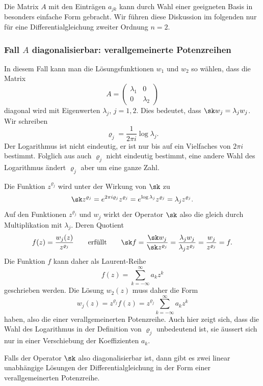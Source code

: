 Die Matrix $A$ mit den Einträgen $a_{jk}$ kann durch Wahl einer
geeigneten Basis in besonders einfache Form gebracht.
Wir führen diese Diskussion im folgenden nur für eine Differentialgleichung
zweiter Ordnung $n=2$.

%
%
\subsubsection{Fall $A$ diagonalisierbar: verallgemeinerte Potenzreihen}
In diesem Fall kann man die Lösungsfunktionen $w_1$ und $w_2$ so
wählen, dass die Matrix
\[
A=\begin{pmatrix}\lambda_1&0\\0&\lambda_2\end{pmatrix}
\]
diagonal wird mit Eigenwerten $\lambda_j$, $j=1,2$.
Dies bedeutet, dass $\sk w_j = \lambda_j w_j$.
Wir schreiben
\[
\varrho_j = \frac{1}{2\pi i} \log\lambda_j.
\]
Der Logarithmus ist nicht eindeutig, er ist nur bis auf ein Vielfaches
von $2\pi i$ bestimmt.
Folglich aus auch $\varrho_j$ nicht eindeutig bestimmt, eine
andere Wahl des Logarithmus ändert $\varrho_j$ aber um eine ganze Zahl.

Die Funktion $z^{\varrho_j}$ wird unter der Wirkung von $\sk$ zu
\[
\sk z^{\varrho_j}
=
e^{2\pi i\varrho_j} z^{\varrho_j}
=
e^{\log \lambda_j} z^{\varrho_j}
=
\lambda_j z^{\varrho_j}.
\]
Auf den Funktionen $z^{\varrho_j}$ und $w_j$ wirkt der Operator $\sk$
also die gleich durch Multiplikation mit $\lambda_j$.
Deren Quotient
\[
f(z) = \frac{w_j(z)}{z^{\varrho_j}}
\qquad\text{erfüllt}\qquad
\sk f
=
\frac{\sk w_j}{\sk z^{\varrho_j}}
=
\frac{\lambda_j w_j}{\lambda_j z^{\varrho_j}}
=
\frac{w_j}{z^{\varrho_j}}
=
f.
\]
Die Funktion $f$ kann daher als Laurent-Reihe
\[
f(z) 
=
\sum_{k=-\infty}^\infty a_kz^k
\]
geschrieben werden.
Die Lösung $w_2(z)$ muss daher die Form
\begin{equation}
w_j(z)
=
z^{\varrho_j} f(z)
=
z^{\varrho_j} \sum_{k=-\infty}^\infty a_kz^k
\end{equation}
haben, also die einer verallgemeinerten Potenzreihe.
Auch hier zeigt sich, dass die Wahl des Logarithmus in der Definition
von $\varrho_j$ unbedeutend ist, sie äussert sich nur in einer
Verschiebung der Koeffizienten $a_k$.

Falls der Operator $\sk$ also diagonalisierbar ist, dann gibt es
zwei linear unabhängige Lösungen der Differentialgleichung in der
Form einer verallgemeinerten Potenzreihe.

%
%
